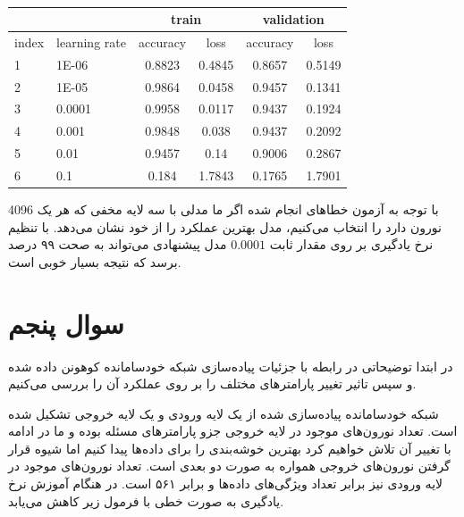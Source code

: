 \documentclass[12pt, a4paper]{article}
\begin{document}
\begin{latin}
\begin{table}[!ht]
    \centering
    \caption{}
    \label{mlp_learning_rate}
    \begin{tabular}{|l|l|c|c|c|c|}
    \hline
        & & \multicolumn{2}{c|}{train} & \multicolumn{2}{c|}{validation}  \\ \hline
        index & learning rate & accuracy & loss & accuracy & loss \\ \hline
        1 & 1E-06 & 0.8823 & 0.4845 & 0.8657 & 0.5149 \\ \hline
        2 & 1E-05 & 0.9864 & 0.0458 & 0.9457 & 0.1341 \\ \hline
        3 & 0.0001 & 0.9958 & 0.0117 & 0.9437 & 0.1924 \\ \hline
        4 & 0.001 & 0.9848 & 0.038 & 0.9437 & 0.2092 \\ \hline
        5 & 0.01 & 0.9457 & 0.14 & 0.9006 & 0.2867 \\ \hline
        6 & 0.1 & 0.184 & 1.7843 & 0.1765 & 1.7901 \\ \hline
    \end{tabular}
\end{table}
\end{latin}

\newpage

با توجه به آزمون خطاهای انجام شده اگر ما مدلی با سه لایه مخفی که هر یک 4096 نورون دارد را انتخاب می‌کنیم،
مدل بهترین عملکرد را از خود نشان می‌دهد. با تنظیم نرخ یادگیری
بر روی مقدار ثابت $0.0001$ مدل پیشنهادی می‌تواند به صحت ۹۹ درصد برسد که نتیجه بسیار خوبی است.

\section*{سوال پنجم}

در ابتدا توضیحاتی در رابطه با جزئیات پیاده‌سازی شبکه خودسامانده کوهونن داده شده و سپس تاثیر تغییر پارامتر‌های مختلف
را بر روی عملکرد آن را بررسی می‌کنیم.

شبکه خودسامانده پیاده‌سازی شده از یک لایه ورودی و یک لایه خروجی تشکیل شده است. تعداد نورون‌های موجود در لایه خروجی
جزو پارامتر‌های مسئله بوده و ما در ادامه با تغییر آن تلاش خواهیم کرد بهترین خوشه‌بندی را برای داده‌ها پیدا کنیم
اما شیوه قرار گرفتن نورون‌های خروجی همواره به صورت دو بعدی است. تعداد نورون‌های موجود در لایه ورودی نیز برابر تعداد
ویژگی‌های داده‌ها و برابر ۵۶۱ است. در هنگام آموزش نرخ یادگیری به صورت خطی با فرمول زیر کاهش می‌یابد.
\end{document}
